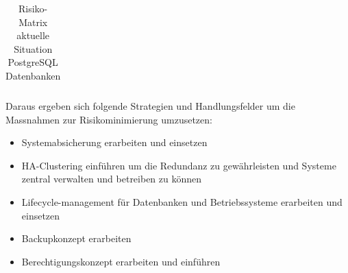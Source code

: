 \begin{flushleft}
\begin{table}[]
{\begin{tabular}{llllllllllll}
    \end{tabular}%
    }
    \caption{Risiko-Matrix aktuelle Situation PostgreSQL Datenbanken}
    \label{tab:riskmatrix-postgresql}
    \end{table}
\end{flushleft}
\clearpage
{}
\recalctypearea
\begin{flushleft}

\end{flushleft}
\begin{flushleft}
    Daraus ergeben sich folgende Strategien und Handlungsfelder um die Massnahmen zur Risikominimierung umzusetzen:
    \begin{itemize}
        \item Systemabsicherung erarbeiten und einsetzen
        \item HA-Clustering einführen um die Redundanz zu gewährleisten und Systeme zentral verwalten und betreiben zu können
        \item Lifecycle-management für Datenbanken und Betriebssysteme erarbeiten und einsetzen
        \item Backupkonzept erarbeiten
        \item Berechtigungskonzept erarbeiten und einführen
    \end{itemize}
\end{flushleft}
